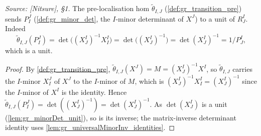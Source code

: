 \begin{lemma}

  \label{lem:gr_transition_pre_unit}
  \textit{Source: [Nitsure], \S 1.}
  The pre-localisation hom \(\tilde\theta_{I,J}\) (\cref{def:gr_transition_pre})
  sends \(P^J_I\) (\cref{def:gr_minor_det}, the \(I\)-minor determinant of
  \(X^J\)) to a unit of \(R^I_J\). Indeed
  \[
    \tilde\theta_{I,J}(P^J_I) = \det\bigl((X^I_J)^{-1} X^I_I\bigr)
      = \det\bigl((X^I_J)^{-1}\bigr) = \det(X^I_J)^{-1} = 1/P^I_J,
  \]
  which is a unit.
\end{lemma}
\begin{proof}
  \leanok
  By \cref{def:gr_transition_pre}, \(\tilde\theta_{I,J}(X^J) = M = (X^I_J)^{-1}
  X^I\), so \(\tilde\theta_{I,J}\) carries the \(I\)-minor \(X^J_I\) of \(X^J\) to
  the \(I\)-minor of \(M\), which is \((X^I_J)^{-1} X^I_I = (X^I_J)^{-1}\) since
  the \(I\)-minor of \(X^I\) is the identity. Hence \(\tilde\theta_{I,J}(P^J_I) =
  \det((X^I_J)^{-1}) = \det(X^I_J)^{-1}\). As \(\det(X^I_J)\) is a unit
  (\cref{lem:gr_minorDet_unit}), so is its inverse; the matrix-inverse
  determinant identity uses \cref{lem:gr_universalMinorInv_identities}.
\end{proof}

